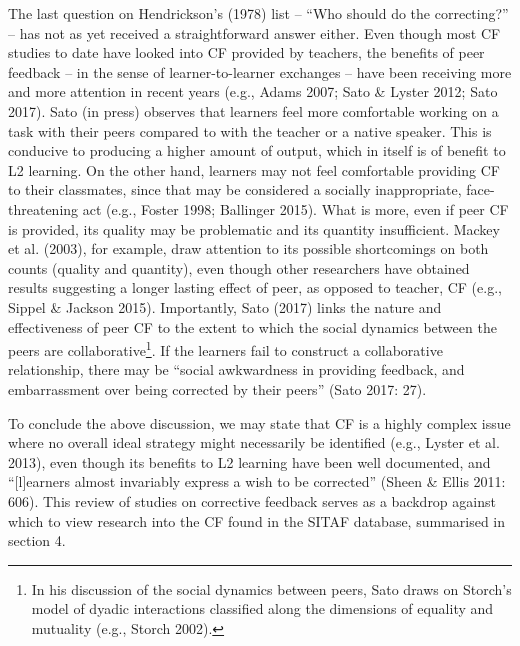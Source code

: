 \documentclass[12pt]{article}
\newenvironment{styleStandard}{\setlength\leftskip{0cm}\setlength\rightskip{0cm plus 1fil}\setlength\parindent{0cm}\setlength\parfillskip{0pt plus 1fil}\setlength\parskip{0cm plus 1pt}\writerlistparindent\writerlistleftskip\leavevmode\normalfont\normalsize\writerlistlabel\ignorespaces}{\unskip\vspace{0cm plus 1pt}\par}
\newcommand\writerlistleftskip{}
\newcommand\writerlistparindent{}
\newcommand\writerlistlabel{}
\begin{document}
\begin{styleStandard}
The last question on Hendrickson’s (1978) list – “Who should do the correcting?” – has not as yet received a straightforward answer either. Even though most CF studies to date have looked into CF provided by teachers, the benefits of peer feedback – in the sense of learner-to-learner exchanges – have been receiving more and more attention in recent years (e.g., Adams 2007; Sato \& Lyster 2012; Sato 2017). Sato (in press) observes that learners feel more comfortable working on a task with their peers compared to with the teacher or a native speaker. This is conducive to producing a higher amount of output, which in itself is of benefit to L2 learning. On the other hand, learners may not feel comfortable providing CF to their classmates, since that may be considered a socially inappropriate, face-threatening act (e.g., Foster 1998; Ballinger 2015). What is more, even if peer CF is provided, its quality may be problematic and its quantity insufficient. Mackey et al. (2003), for example, draw attention to its possible shortcomings on both counts (quality and quantity), even though other researchers have obtained results suggesting a longer lasting effect of peer, as opposed to teacher, CF (e.g., Sippel \& Jackson 2015). Importantly, Sato (2017) links the nature and effectiveness of peer CF to the extent to which the social dynamics between the peers are collaborative\footnote{\textrm{ In his discussion of the social dynamics between peers, Sato draws on Storch’s model of dyadic interactions classified along the dimensions of equality and mutuality (e.g., Storch 2002).}}. If the learners fail to construct a collaborative relationship, there may be “social awkwardness in providing feedback, and embarrassment over being corrected by their peers” (Sato 2017: 27).
\end{styleStandard}

\begin{styleStandard}
To conclude the above discussion, we may state that CF is a highly complex issue where no overall ideal strategy might necessarily be identified (e.g., Lyster et al. 2013), even though its benefits to L2 learning have been well documented, and “[l]earners almost invariably express a wish to be corrected” (Sheen \& Ellis 2011: 606). This review of studies on corrective feedback serves as a backdrop against which to view research into the CF found in the SITAF database, summarised in section 4. 
\end{styleStandard}
\end{document}
